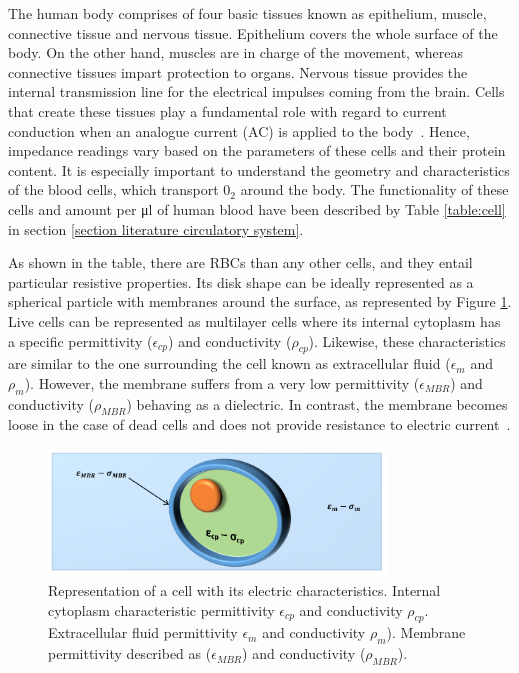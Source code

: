 The human body comprises of four basic tissues known as epithelium, muscle, connective tissue and nervous tissue. Epithelium covers the whole surface of the body. On the other hand, muscles are in charge of the movement, whereas connective tissues impart protection to organs. Nervous tissue provides the internal transmission line for the electrical impulses coming from the brain. Cells that create these tissues play a fundamental role with regard to current conduction when an analogue current (AC) is applied to the body~\cite{lvovich2012impedance}. Hence, impedance readings vary based on the parameters of these cells and their protein content. It is especially important to understand the geometry and characteristics of the blood cells, which transport $0_2$ around the body. The functionality of these cells and amount per \si{\micro\litre} of human blood have been described by Table \ref{table:cell} in section \ref{section literature circulatory system}.

As shown in the table, there are RBCs than any other cells, and they entail particular resistive properties. Its disk shape can be ideally represented as a spherical particle with membranes around the surface, as represented by Figure \ref{fig:cell}. Live cells can be represented as multilayer cells where its internal cytoplasm has a specific permittivity ($\epsilon_{cp}$) and conductivity ($\rho_{cp}$). Likewise, these characteristics are similar to the one surrounding the cell known as extracellular fluid ($\epsilon_m$ and $\rho_m$). However, the membrane suffers from a very low permittivity ($\epsilon_{MBR}$) and conductivity ($\rho_{MBR}$) behaving as a dielectric. In contrast, the membrane becomes loose in the case of dead cells and does not provide resistance to electric current~\cite{lvovich2012impedance}.

\begin{figure}[!htpb]
	\centering
	\includegraphics[width=0.8\textwidth,keepaspectratio, trim={0cm 0cm 0cm 0cm},clip]{figure1}    
	\caption[Cell permeability and conductivity distribution]{Representation of a cell with its electric characteristics. Internal cytoplasm characteristic permittivity $\epsilon_{cp}$ and conductivity $\rho_{cp}$. Extracellular fluid permittivity $\epsilon_m$ and conductivity $\rho_m$). Membrane permittivity described as ($\epsilon_{MBR}$) and conductivity ($\rho_{MBR}$).}
	\label{fig:cell}
\end{figure}

